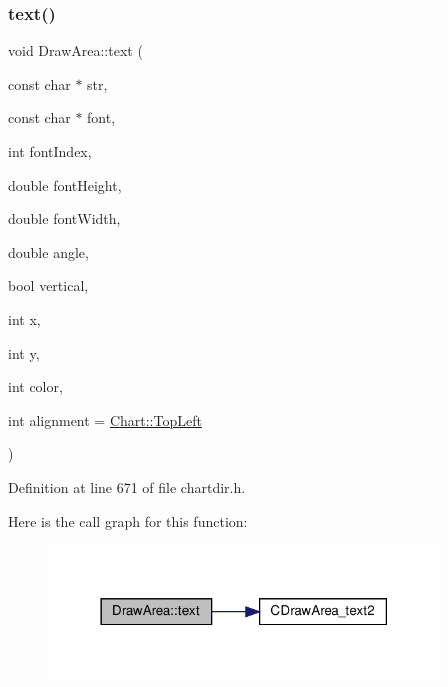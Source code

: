 \subsubsection{\texorpdfstring{text()}{text()}\hspace{0.1cm}{\footnotesize\ttfamily [3/8]}}
{\footnotesize\ttfamily void Draw\+Area\+::text (\begin{DoxyParamCaption}\item[{const char $\ast$}]{str,  }\item[{const char $\ast$}]{font,  }\item[{int}]{font\+Index,  }\item[{double}]{font\+Height,  }\item[{double}]{font\+Width,  }\item[{double}]{angle,  }\item[{bool}]{vertical,  }\item[{int}]{x,  }\item[{int}]{y,  }\item[{int}]{color,  }\item[{int}]{alignment = {\ttfamily \hyperlink{namespace_chart_ae222e51ce11a254450b6ddfbc862680aa0bf92d1d2d6713aa62e92b86b9a8532f}{Chart\+::\+Top\+Left}} }\end{DoxyParamCaption})\hspace{0.3cm}{\ttfamily [inline]}}



Definition at line 671 of file chartdir.\+h.

Here is the call graph for this function\+:
\nopagebreak
\begin{figure}[H]
\begin{center}
\leavevmode
\includegraphics[width=294pt]{class_draw_area_a2f38315c93227eb8ac4d1675e7ca0db7_cgraph}
\end{center}
\end{figure}
\mbox{\label{class_draw_area_aa73c60ff46156933aebcab3674dd3f44}} 
